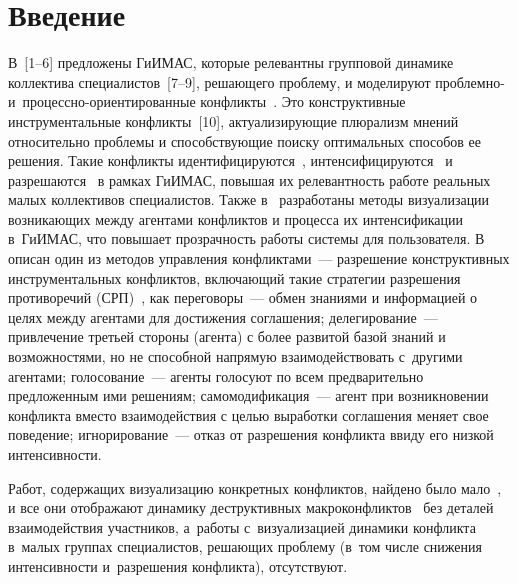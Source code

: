\vspace*{-3pt}



\thispagestyle{headings}

\begin{multicols}{2}

\label{st\stat}
  
\section{Введение}

  В~[1--6] предложены \mbox{ГиИМАС}, 
которые релевантны групповой динамике коллектива специалистов~[7--9], 
решающего проблему, и моделируют проб\-лем\-но-
и~про\-цес\-сно-ори\-ен\-ти\-ро\-ван\-ные конфликты~\cite{1-kir}. Это конструктивные 
инструментальные конфликты~[10], актуализирующие плюрализм мнений 
относительно проблемы и способствующие поиску оптимальных способов ее 
решения. Такие конфликты идентифицируются~\cite{2-kir}, 
интенсифицируются~\cite{3-kir} и разрешаются~\cite{4-kir} в рамках 
\mbox{ГиИМАС}, повышая их 
релевантность работе реальных малых коллективов специалистов. Также 
в~\cite{5-kir, 6-kir} разработаны методы визуализации возникающих между 
агентами конфликтов и процесса их интенсификации в~\mbox{ГиИМАС}, что 
повышает прозрачность работы системы для пользователя. В~\cite{4-kir} 
описан один из методов управления конфликтами~--- разрешение 
конструктивных инструментальных конфликтов, включающий такие стратегии 
разрешения противоречий (СРП)~\cite{11-kir}, как переговоры~--- обмен 
знаниями и информацией о целях между агентами для достижения соглашения; 
делегирование~--- привлечение третьей стороны (агента) с более развитой базой 
знаний и возможностями, но не способной напрямую взаимодействовать 
с~другими агентами; голосование~--- агенты голосуют по всем предварительно 
предложенным ими решениям; самомодификация~--- агент при возникновении 
конфликта вместо взаимодействия с целью выработки соглашения меняет свое 
поведение; игнорирование~--- отказ от разрешения конфликта ввиду его низкой 
интенсивности.
  
  Работ, содержащих визуализацию конкретных конфликтов, найдено было 
мало~\cite{5-kir}, и все они отоб\-ра\-жа\-ют динамику деструктивных 
макроконфликтов~\cite{12-kir} без деталей взаимодействия участников, 
а~работы с~визуализацией динамики конфликта в~малых группах специалистов, 
решающих проб\-ле\-му (в~том чис\-ле снижения интенсивности и~разрешения 
конфликта), отсутствуют. 
  

\end{multicols}
